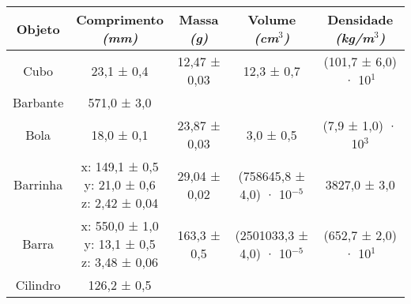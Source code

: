 \documentclass{article}
\begin{document}
\begin{table}[h!]
\centering
\begin{tabular}{c c c c c }
\toprule
Objeto & \shortstack{Comprimento\\\textit{(mm)}} & \shortstack{Massa\\\textit{(g)}} & \shortstack{Volume\\\textit{(cm$^3$)}} & \shortstack{Densidade\\\textit{(kg/m$^3$)}} \\
\midrule
Cubo & 23,1 ± 0,4 & 12,47 ± 0,03 & 12,3 ± 0,7 & (101,7 ± 6,0) · 10$^{1}$\\[5pt]
Barbante & 571,0 ± 3,0 & & & \\[5pt]
Bola & 18,0 ± 0,1 & 23,87 ± 0,03 & 3,0 ± 0,5 & (7,9 ± 1,0) · 10$^{3}$\\[5pt]
Barrinha & \shortstack{x: 149,1 ± 0,5\\y: 21,0 ± 0,6\\z: 2,42 ± 0,04} & 29,04 ± 0,02 & (758645,8 ± 4,0) · 10$^{-5}$ & 3827,0 ± 3,0\\[5pt]
Barra & \shortstack{x: 550,0 ± 1,0\\y: 13,1 ± 0,5\\z: 3,48 ± 0,06} & 163,3 ± 0,5 & (2501033,3 ± 4,0) · 10$^{-5}$ & (652,7 ± 2,0) · 10$^{1}$\\[5pt]
Cilindro & 126,2 ± 0,5 & & & \\[5pt]
\bottomrule
\end{tabular}
\end{table}
\end{document}
